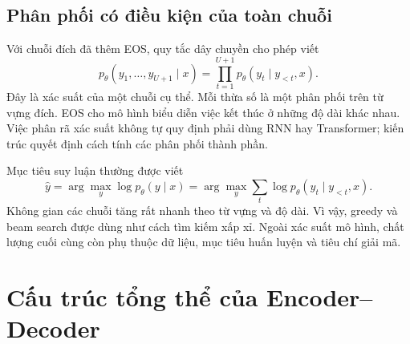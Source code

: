 \documentclass[11pt,a4paper]{article}
\numberwithin{equation}{section}
\begin{document}
\subsection{Phân phối có điều kiện của toàn chuỗi}
Với chuỗi đích đã thêm EOS, quy tắc dây chuyền cho phép viết
\begin{equation}\label{eq:factor}
p_\theta(y_1,\ldots,y_{U+1}\mid x)
=\prod_{t=1}^{U+1}p_\theta(y_t\mid y_{<t},x).
\end{equation}
Đây là xác suất của một chuỗi cụ thể. Mỗi thừa số là một phân phối trên từ vựng đích. EOS cho mô hình biểu diễn việc kết thúc ở những độ dài khác nhau. Việc phân rã xác suất không tự quy định phải dùng RNN hay Transformer; kiến trúc quyết định cách tính các phân phối thành phần.

Mục tiêu suy luận thường được viết
\begin{equation}
\hat y=\arg\max_y\log p_\theta(y\mid x)
=\arg\max_y\sum_t\log p_\theta(y_t\mid y_{<t},x).
\end{equation}
Không gian các chuỗi tăng rất nhanh theo từ vựng và độ dài. Vì vậy, greedy và beam search được dùng như cách tìm kiếm xấp xỉ. Ngoài xác suất mô hình, chất lượng cuối cùng còn phụ thuộc dữ liệu, mục tiêu huấn luyện và tiêu chí giải mã.

\section{Cấu trúc tổng thể của Encoder--Decoder}
\end{document}
